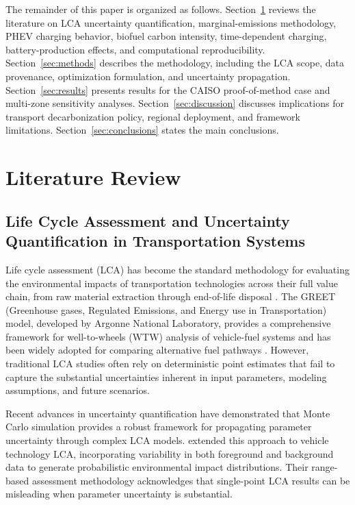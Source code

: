 \documentclass[cleantechnol,article,submit,pdftex,moreauthors]{Definitions/mdpi}
\begin{document}
The remainder of this paper is organized as follows. Section~\ref{sec:literature_review} reviews the literature on LCA uncertainty quantification, marginal-emissions methodology, PHEV charging behavior, biofuel carbon intensity, time-dependent charging, battery-production effects, and computational reproducibility. Section~\ref{sec:methods} describes the methodology, including the LCA scope, data provenance, optimization formulation, and uncertainty propagation. Section~\ref{sec:results} presents results for the CAISO proof-of-method case and multi-zone sensitivity analyses. Section~\ref{sec:discussion} discusses implications for transport decarbonization policy, regional deployment, and framework limitations. Section~\ref{sec:conclusions} states the main conclusions.


\section{Literature Review}
\label{sec:literature_review}

\subsection{Life Cycle Assessment and Uncertainty Quantification in Transportation Systems}

Life cycle assessment (LCA) has become the standard methodology for evaluating the environmental impacts of transportation technologies across their full value chain, from raw material extraction through end-of-life disposal \citep{Elgowainy2018}. The GREET (Greenhouse gases, Regulated Emissions, and Energy use in Transportation) model, developed by Argonne National Laboratory, provides a comprehensive framework for well-to-wheels (WTW) analysis of vehicle-fuel systems and has been widely adopted for comparing alternative fuel pathways \citep{Wang2012}. However, traditional LCA studies often rely on deterministic point estimates that fail to capture the substantial uncertainties inherent in input parameters, modeling assumptions, and future scenarios.

Recent advances in uncertainty quantification have demonstrated that Monte Carlo simulation provides a robust framework for propagating parameter uncertainty through complex LCA models. \citet{Messagie2014} extended this approach to vehicle technology LCA, incorporating variability in both foreground and background data to generate probabilistic environmental impact distributions. Their range-based assessment methodology acknowledges that single-point LCA results can be misleading when parameter uncertainty is substantial.
\end{document}
